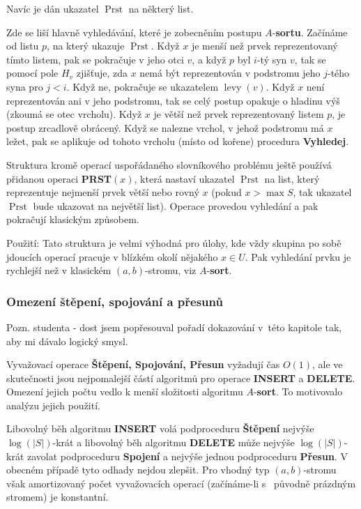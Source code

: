 \documentclass[a4paper,12pt]{article}
\DeclareMathOperator*{\levy}{levy}
\DeclareMathOperator*{\Prst}{Prst}
\begin{document}
Navíc je dán ukazatel 
$\Prst$ na některý list. 

Zde se liší hlavně vyhledávání, které je zobecněním 
postupu $A$-{\bf sortu}. Začínáme od listu $p$, na který ukazuje 
$\Prst$. Když $x$ je menší než prvek reprezentovaný tímto 
listem, pak se pokračuje v jeho otci $v$, a když $p$ 
byl $i$-tý syn $v$, tak se pomocí pole $H_v$ zjišťuje, zda $
x$ 
nemá být reprezentován v podstromu jeho $j$-tého syna pro 
$j<i$. Když ne, pokračuje se  ukazatelem $\levy(v)$. 
Když $x$ není reprezentován ani v jeho podstromu, 
tak se celý postup opakuje o hladinu výš (zkoumá se otec vrcholu). 
Když $x$ je větší než prvek reprezentovaný listem $
p$, 
je postup zrcadlově obrácený. Když se nalezne 
vrchol, v jehož podstromu má $x$ ležet, pak se aplikuje od 
tohoto vrcholu (místo od kořene) procedura {\bf Vyhledej}.



Struktura kromě operací uspořádaného 
slovníkového prob\-lé\-mu 
ještě používá přidanou ope\-raci {\bf PRST$(x)$}, která nastaví ukazatel 
$\Prst$ na list, který reprezentuje nejmenší prvek větší 
nebo rovný $x$ (pokud $x>\max S$, tak ukazatel $\Prst$ bude 
ukazovat na největší list). Operace provedou vyhledání a 
pak pokračují klasickým způsobem.

Použití: Tato struktura je velmi výhodná pro 
úlohy, kde vždy skupina po sobě jdoucích ope\-rací  
pracuje v blízkém okolí něja\-ké\-ho $x\in U$. Pak 
vyhledání prvku je rychlejší než v klasickém 
$(a,b)$-stromu, viz $A$-{\bf sort}.

\subsubsection{Omezení štěpení, spojování a přesunů}

Pozn. studenta - dost jsem popřesouval pořadí dokazování v~této kapitole tak, aby mi dávalo logický smysl.

Vyvažovací operace {\bf Štěpení, Spojování, Přesun }
vyžadují čas $O(1)$, ale ve skutečnosti jsou nejpomalejší 
částí 
algoritmů pro operace {\bf INSERT} a {\bf DELETE}.  Omezení 
jejich počtu vedlo k menší složitosti algoritmu $A$-{\bf sort}.  To motivovalo analýzu 
jejich použití.

Libovolný běh algoritmu {\bf INSERT }
volá podproceduru {\bf Štěpe\-ní} nejvýše $\log(|
S|)$-krát a libovolný běh 
algoritmu  {\bf DELETE} mů\-že nejvýše $\log(|S|
)$-krát zavolat podproceduru 
{\bf Spojení }
a nejvýše jednou podproceduru {\bf Přesun}.  V obecném 
případě tyto od\-ha\-dy nejdou zlepšit.  Pro vhodný typ 
$(a,b)$-stromu však amortizovaný počet vyvažovacích 
ope\-rací (začínáme-li s~ 
pů\-vod\-ně práz\-dným stromem) je konstantní.
\end{document}
